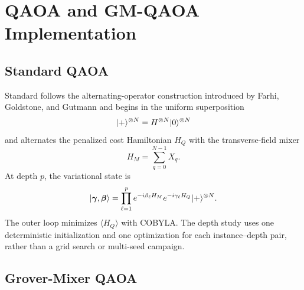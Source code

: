 \section{QAOA and GM-QAOA Implementation}

\subsection{Standard QAOA}

Standard \QAOA{} follows the alternating-operator construction introduced by Farhi, Goldstone, and Gutmann \cite{farhi2014} and begins in the uniform superposition
\begin{equation}
\lvert +\rangle^{\otimes N}=H^{\otimes N}\lvert 0\rangle^{\otimes N}
\end{equation}
and alternates the penalized cost Hamiltonian $H_Q$ with the transverse-field mixer
\begin{equation}
H_M=\sum_{q=0}^{N-1}X_q.
\end{equation}
At depth $p$, the variational state is
\begin{equation}
\lvert \bm\gamma,\bm\beta\rangle=
\prod_{\ell=1}^{p}
  e^{-i\beta_\ell H_M}
  e^{-i\gamma_\ell H_Q}
\lvert +\rangle^{\otimes N}.
\label{eq:standard_qaoa_state}
\end{equation}
The outer loop minimizes $\langle H_Q\rangle$ with COBYLA. The depth study uses one deterministic initialization and one optimization for each instance--depth pair, rather than a grid search or multi-seed campaign.

\subsection{Grover-Mixer QAOA}

